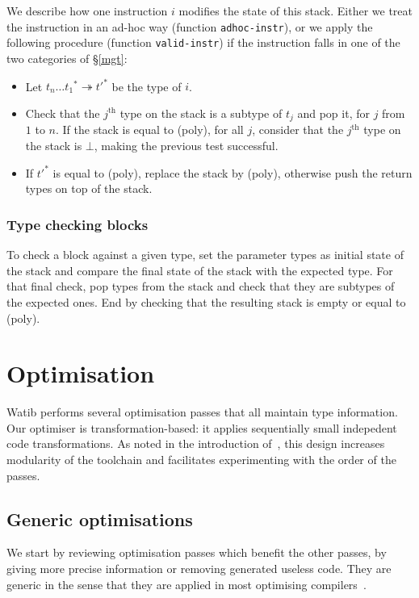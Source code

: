 \documentclass[a4paper,11pt]{article}
\begin{document}
We describe how one instruction $i$ modifies the state of this stack. Either we
treat the instruction in an ad-hoc way (function \texttt{adhoc-instr}), or we
apply the following procedure (function \texttt{valid-instr}) if the instruction
falls in one of the two categories of \S\ref{mgt}:
\begin{itemize}\setlength{\itemsep}{0pt}
\item Let ${t_n\ldots t_1}^*\twoheadrightarrow{t'}^*$ be the type of $i$.
\item Check that the $j^{\text{th}}$ type on the stack is a subtype of $t_j$ and
  pop it, for $j$ from $1$ to $n$. If the stack is equal to \textsf{(poly)}, for
  all $j$, consider that the $j^{\text{th}}$ type on the stack is $\bot$, making
  the previous test successful.
\item If ${t'}^*$ is equal to \textsf{(poly)}, replace the stack by
  \textsf{(poly)}, otherwise push the return types on top of the stack.
\end{itemize}

\subsubsection{Type checking blocks}
To check a block against a given type, set the parameter types as initial state
of the stack and compare the final state of the stack with the expected
type. For that final check, pop types from the stack and check that they
are subtypes of the expected ones. End by checking that the resulting stack is
empty or equal to \textsf{(poly)}.

\section{Optimisation}\label{opt}
\textsf{Watib} performs several optimisation passes that all maintain type
information. Our optimiser is transformation-based: it applies sequentially
small indepedent code transformations. As noted in the introduction
of~\cite{jones1998transformation}, this design increases modularity of the
toolchain and facilitates experimenting with the order of the passes.


\subsection{Generic optimisations}
We start by reviewing optimisation passes which benefit the other passes, by
giving more precise information or removing generated useless code. They are
generic in the sense that they are applied in most optimising
compilers~\cite{muchnick1997advanced}.
\end{document}
